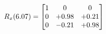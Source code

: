 \documentclass[preview]{standalone}
\begin{document}
\begin{align*}
\special{dvisvgm:raw <g id='unique000'>}R_{x}(6.07) = \begin{bmatrix}1 & 0 & 0 \\0 & +0.98 & +0.21 \\0 & -0.21 & +0.98\end{bmatrix}\special{dvisvgm:raw </g>}
\end{align*}
\end{document}
